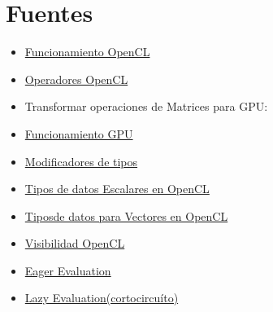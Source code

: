 \documentclass[12pt,a4paper]{article}
\begin{document}
\section{Fuentes}
\begin{itemize}
\item \href{https://www.khronos.org/assets/uploads/developers/library/overview/opencl_overview.pdf}{ Funcionamiento OpenCL}
\item \href{https://www.khronos.org/registry/cl/sdk/2.0/docs/man/xhtml/operators.html}{Operadores OpenCL}
\item Transformar operaciones de Matrices para GPU:
\item \href{https://www.khronos.org/assets/uploads/developers/library/overview/opencl_overview.pdf#page=8}{Funcionamiento GPU}
\item \href{https://www.khronos.org/registry/cl/specs/opencl-2.0-openclc.pdf#page=51}{Modificadores de tipos}
\item \href{https://www.khronos.org/registry/cl/specs/opencl-2.0-openclc.pdf#page=6}{Tipos de datos Escalares en OpenCL}
\item \href{https://www.khronos.org/registry/cl/specs/opencl-2.0-openclc.pdf#page=9}{Tiposde datos para Vectores en OpenCL}
\item \href{https://www.khronos.org/registry/cl/specs/opencl-2.0-openclc.pdf#page=50}{Visibilidad OpenCL}
\item \href{http://en.wikipedia.org/wiki/Eager_evaluation}{Eager Evaluation}
\item \href{http://en.wikipedia.org/wiki/Lazy_evaluation}{Lazy Evaluation(cortocircuíto)}
\end{itemize}
\end{document}
